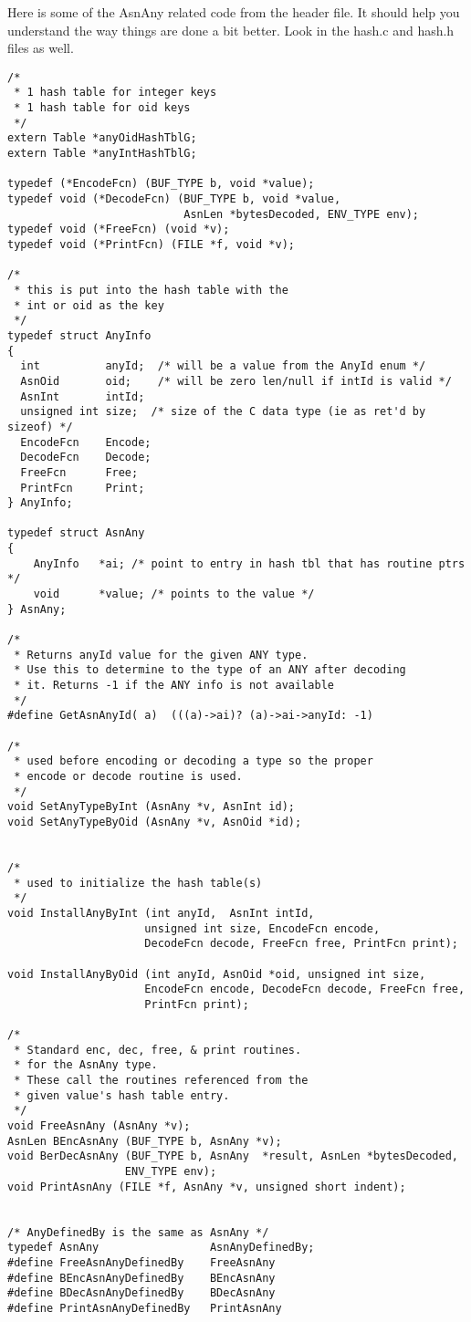 Here is some of the {\C AsnAny} related code from the header file.  It
should help you understand the way things are done a bit better.  Look
in the {\ufn hash.c} and {\ufn hash.h} files as well.
\begin{small}
\begin{verbatim}
/*
 * 1 hash table for integer keys
 * 1 hash table for oid keys
 */
extern Table *anyOidHashTblG;
extern Table *anyIntHashTblG;

typedef (*EncodeFcn) (BUF_TYPE b, void *value);
typedef void (*DecodeFcn) (BUF_TYPE b, void *value,
                           AsnLen *bytesDecoded, ENV_TYPE env);
typedef void (*FreeFcn) (void *v);
typedef void (*PrintFcn) (FILE *f, void *v);

/*
 * this is put into the hash table with the
 * int or oid as the key
 */
typedef struct AnyInfo
{
  int          anyId;  /* will be a value from the AnyId enum */
  AsnOid       oid;    /* will be zero len/null if intId is valid */
  AsnInt       intId;
  unsigned int size;  /* size of the C data type (ie as ret'd by sizeof) */
  EncodeFcn    Encode;
  DecodeFcn    Decode;
  FreeFcn      Free;
  PrintFcn     Print;
} AnyInfo;

typedef struct AsnAny
{
    AnyInfo   *ai; /* point to entry in hash tbl that has routine ptrs */
    void      *value; /* points to the value */
} AsnAny;

/*
 * Returns anyId value for the given ANY type.
 * Use this to determine to the type of an ANY after decoding
 * it. Returns -1 if the ANY info is not available
 */
#define GetAsnAnyId( a)  (((a)->ai)? (a)->ai->anyId: -1)

/*
 * used before encoding or decoding a type so the proper
 * encode or decode routine is used.
 */
void SetAnyTypeByInt (AsnAny *v, AsnInt id);
void SetAnyTypeByOid (AsnAny *v, AsnOid *id);


/*
 * used to initialize the hash table(s)
 */
void InstallAnyByInt (int anyId,  AsnInt intId,
                     unsigned int size, EncodeFcn encode,
                     DecodeFcn decode, FreeFcn free, PrintFcn print);

void InstallAnyByOid (int anyId, AsnOid *oid, unsigned int size,
                     EncodeFcn encode, DecodeFcn decode, FreeFcn free,
                     PrintFcn print);

/*
 * Standard enc, dec, free, & print routines.
 * for the AsnAny type.
 * These call the routines referenced from the
 * given value's hash table entry.
 */
void FreeAsnAny (AsnAny *v);
AsnLen BEncAsnAny (BUF_TYPE b, AsnAny *v);
void BerDecAsnAny (BUF_TYPE b, AsnAny  *result, AsnLen *bytesDecoded,
                  ENV_TYPE env);
void PrintAsnAny (FILE *f, AsnAny *v, unsigned short indent);


/* AnyDefinedBy is the same as AsnAny */
typedef AsnAny                 AsnAnyDefinedBy;
#define FreeAsnAnyDefinedBy    FreeAsnAny
#define BEncAsnAnyDefinedBy    BEncAsnAny
#define BDecAsnAnyDefinedBy    BDecAsnAny
#define PrintAsnAnyDefinedBy   PrintAsnAny
\end{verbatim}
\end{small}



